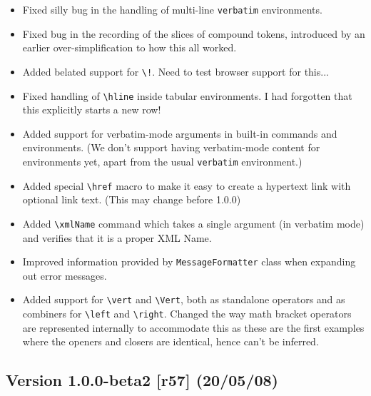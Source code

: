 \begin{itemize}

  \item Fixed silly bug in the handling of multi-line \verb|verbatim|
  environments.

  \item Fixed bug in the recording of the slices of compound tokens, introduced
  by an earlier over-simplification to how this all worked.

  \item Added belated support for \verb|\!|. Need to test browser support for
  this...

  \item Fixed handling of \verb|\hline| inside tabular environments. I had
  forgotten that this explicitly starts a new row!

  \item Added support for verbatim-mode arguments in built-in commands and
  environments.  (We don't support having verbatim-mode content for
  environments yet, apart from the usual \verb|verbatim| environment.)

  \item Added special \verb|\href| macro to make it easy to create a hypertext
  link with optional link text. (This may change before 1.0.0)

  \item Added \verb|\xmlName| command which takes a single argument (in
  verbatim mode) and verifies that it is a proper XML Name.

  \item Improved information provided by \verb|MessageFormatter| class when
  expanding out error messages.

  \item Added support for \verb|\vert| and \verb|\Vert|, both as standalone
  operators and as combiners for \verb|\left| and \verb|\right|. Changed the
  way math bracket operators are represented internally to accommodate this as
  these are the first examples where the openers and closers are identical,
  hence can't be inferred.

\end{itemize}

\subsection*{Version 1.0.0-beta2 [r57] (20/05/08)}

